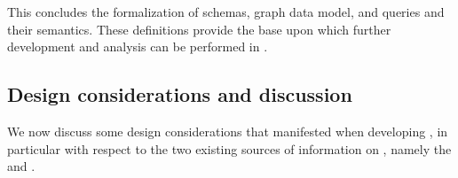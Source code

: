 

This concludes the formalization of \gql schemas, graph data model, and queries and their semantics.  These definitions provide the base upon which further development and analysis can be performed in \gcoql.


\subsection{Design considerations and discussion}\label{subsec:discussion}

We now discuss some design considerations that manifested when developing 
\gcoql, in particular with respect to the two existing sources of information on \gql, namely the \spec and \HP.

